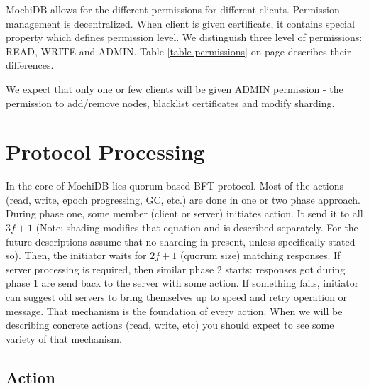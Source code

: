 \documentclass[letterpaper,twocolumn,10pt]{article}
\begin{document}
MochiDB allows for the different permissions for different clients. Permission management is decentralized. When client is given certificate, it contains special property which defines permission level. We distinguish three level of permissions: READ, WRITE and ADMIN. Table \ref{table-permissions} on page \pageref{table-permissions} describes their differences.

\begin{table}[]
\centering
\caption{MochiDB permissions}
\label{table-permissions}
\end{table}

We expect that only one or few clients will be given ADMIN permission - the permission to add/remove nodes, blacklist certificates and modify sharding.

\section{Protocol Processing}
In the core of MochiDB lies quorum based BFT protocol. Most of the actions (read, write, epoch progressing, GC, etc.) are done in one or two phase approach. During phase one, some member (client or server) initiates action. It send it to all $3f+1$ (Note: shading modifies that equation and is described separately. For the future descriptions assume that no sharding in present, unless specifically stated so). Then, the initiator waits for $2f+1$ (quorum size) matching responses. If server processing is required, then similar phase 2 starts: responses got during phase 1 are send back to the server with some action. If something fails, initiator can suggest old servers to bring themselves up to speed and retry operation or message.
That mechanism is the foundation of every action. When we will be describing concrete actions (read, write, etc) you should expect to see some variety of that mechanism.

\subsection{Action}
\end{document}
